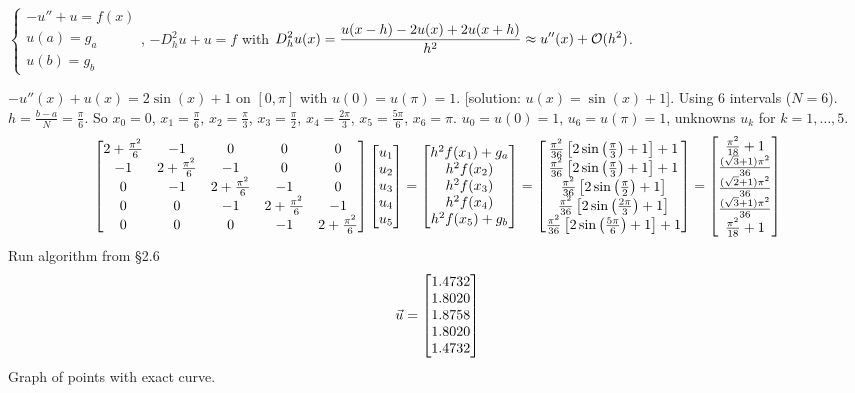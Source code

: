 \documentclass[]{article}
\begin{document}
\begin{recall}
	$\begin{cases} -u''+u = f(x) \\ u(a) = g_a \\ u(b) = g_b \end{cases}$,
	$-D_h^2u+u = f$ with $\displaystyle D_h^2u(x) = \frac{u(x-h)-2u(x)+2u(x+h)}{h^2} \approx u''(x)+\mathcal{O}(h^2)$.
\end{recall}
\begin{example}
	$-u''(x) + u(x) = 2\sin(x)+1$ on $[0,\pi]$ with $u(0)=u(\pi)=1$. [solution: $u(x)=\sin(x)+1$].
	Using 6 intervals ($N=6$).
	$h = \frac{b-a}N = \frac\pi6$.
	So $x_0=0$, $x_1=\frac\pi6$, $x_2=\frac\pi3$, $x_3=\frac\pi2$, $x_4=\frac{2\pi}3$, $x_5=\frac{5\pi}6$, $x_6=\pi$. $u_0 = u(0) = 1$, $u_6=u(\pi)=1$, unknowns $u_k$ for $k=1,\dots,5$.
	$$ \begin{bmatrix}
		2+\frac{\pi^2}6 & -1 & 0 & 0 & 0 \\
		-1 & 2+\frac{\pi^2}6 & -1 & 0 & 0 \\
		0 & -1 & 2+\frac{\pi^2}6 & -1 & 0 \\
		0 & 0 & -1 & 2+\frac{\pi^2}6 & -1 \\
		0 & 0 & 0 & -1 & 2+\frac{\pi^2}6 \end{bmatrix}
		\begin{bmatrix}u_1\\u_2\\u_3\\u_4\\u_5\end{bmatrix} =
		\begin{bmatrix}h^2f(x_1)+g_a\\h^2f(x_2)\\h^2f(x_3)\\h^2f(x_4)\\h^2f(x_5)+g_b\end{bmatrix} =
		\begin{bmatrix}\frac{\pi^2}{36}\left[2\sin\left(\frac\pi3\right)+1\right]+1 \\
			\frac{\pi^2}{36}\left[2\sin\left(\frac\pi3\right)+1\right]+1 \\
			\frac{\pi^2}{36}\left[2\sin\left(\frac\pi2\right)+1\right] \\
			\frac{\pi^2}{36}\left[2\sin\left(\frac{2\pi}3\right)+1\right] \\
			\frac{\pi^2}{36}\left[2\sin\left(\frac{5\pi}6\right)+1\right] +1\end{bmatrix} = 
			\begin{bmatrix}\frac{\pi^2}{18}+1\\\frac{(\sqrt3+1)\pi^2}{36} \\ \frac{(\sqrt2+1)\pi^2}{36} \\ \frac{(\sqrt3+1)\pi^2}{36} \\ \frac{\pi^2}{18}+1\end{bmatrix}$$
	Run algorithm from \S2.6
	$$ \vec{u} = \begin{bmatrix}1.4732\\1.8020\\1.8758\\1.8020\\1.4732\end{bmatrix}$$
	Graph of points with exact curve.
\end{example}
\end{document}
